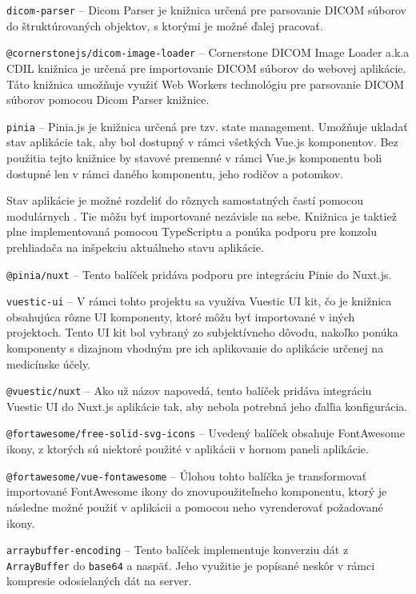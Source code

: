 \texttt{dicom-parser} -- Dicom Parser je knižnica určená pre parsovanie DICOM súborov do štruktúrovaných objektov, s ktorými je možné ďalej pracovať.

\texttt{@cornerstonejs/dicom-image-loader} -- Cornerstone DICOM Image Loader a.k.a CDIL knižnica je určená pre importovanie DICOM súborov do webovej aplikácie. Táto knižnica umožňuje využiť Web Workers technológiu pre parsovanie DICOM súborov pomocou Dicom Parser knižnice.

\texttt{pinia} -- Pinia.js je knižnica určená pre tzv. state management. Umožňuje ukladať stav aplikácie tak, aby bol dostupný v rámci všetkých Vue.js komponentov. Bez použitia tejto knižnice by stavové premenné v rámci Vue.js komponentu boli dostupné len v rámci daného komponentu, jeho rodičov a potomkov.

\clearpage

Stav aplikácie je možné rozdeliť do rôznych samostatných častí pomocou modulárnych . Tie môžu byť importované nezávisle na sebe. Knižnica je taktiež plne implementovaná pomocou TypeScriptu a ponúka podporu pre konzolu prehliadača na inšpekciu aktuálneho stavu aplikácie.

\texttt{@pinia/nuxt} -- Tento balíček pridáva podporu pre integráciu Pinie do Nuxt.js.

\texttt{vuestic-ui} -- V rámci tohto projektu sa využíva Vuestic UI kit, čo je knižnica obsahujúca rôzne UI komponenty, ktoré môžu byť importované v iných projektoch. Tento UI kit bol vybraný zo subjektívneho dôvodu, nakoľko ponúka komponenty s dizajnom vhodným pre ich aplikovanie do aplikácie určenej na medicínske účely.

\texttt{@vuestic/nuxt} -- Ako už názov napovedá, tento balíček pridáva integráciu Vuestic UI do Nuxt.js aplikácie tak, aby nebola potrebná jeho ďalľia konfigurácia.

\texttt{@fortawesome/free-solid-svg-icons} -- Uvedený balíček obsahuje FontAwesome ikony, z ktorých sú niektoré použité v aplikácii v hornom paneli aplikácie.

\texttt{@fortawesome/vue-fontawesome} -- Úlohou tohto balíčka je transformovať importované FontAwesome ikony do znovupoužiteľneho komponentu, ktorý je následne možné použiť v aplikácii a pomocou neho vyrenderovať požadované ikony.

\texttt{arraybuffer-encoding} -- Tento balíček implementuje konverziu dát z \texttt{ArrayBuffer} do \texttt{base64} a naspäť. Jeho využitie je popísané neskôr v rámci kompresie odosielaných dát na server.


